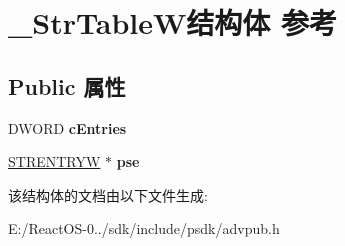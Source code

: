 \hypertarget{struct___str_table_w}{}\section{\+\_\+\+Str\+Table\+W结构体 参考}
\label{struct___str_table_w}
\subsection*{Public 属性}
\begin{DoxyCompactItemize}
\item 
\mbox{\label{struct___str_table_w_a0f3e524f2a3bb742ebf4fa63681ebc61}} 
D\+W\+O\+RD {\bfseries c\+Entries}
\item 
\mbox{\label{struct___str_table_w_a8d12b0d7325e4eaa7233f8a028e50cd0}} 
\hyperlink{struct___str_entry_w}{S\+T\+R\+E\+N\+T\+R\+YW} $\ast$ {\bfseries pse}
\end{DoxyCompactItemize}


该结构体的文档由以下文件生成\+:\begin{DoxyCompactItemize}
\item 
E\+:/\+React\+O\+S-\/0../sdk/include/psdk/advpub.\+h\end{DoxyCompactItemize}
